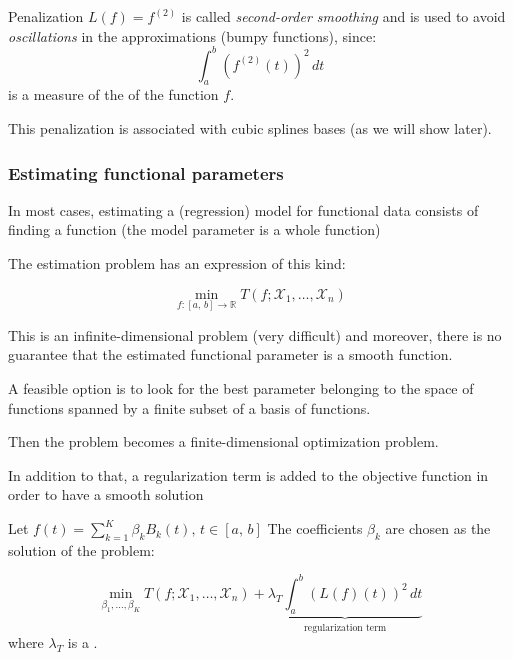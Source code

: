Penalization $L(f) = f^{(2)}$ is called \emph{second-order smoothing} and
is used to avoid \emph{oscillations} in the approximations (bumpy functions),
since:
\begin{equation*}
    \int_{a}^{b} \left(
        f^{(2)}(t)
    \right)^2\, dt
\end{equation*}
is a measure of the  of the function $f$.

\begin{note}
    This penalization is associated with cubic splines bases (as we will show later).
\end{note}

\subsubsection{Estimating functional parameters}

In most cases, estimating a (regression) model for functional data
consists of finding a function (the model parameter is a whole function)

The estimation problem has an expression of this kind:
\begin{problem}{}{}
    \begin{equation*}
        \min_{f:[a,\,b] \to \mathds R} T(f; \mathcal X_1,\ldots,\mathcal X_n)
    \end{equation*}
\end{problem}

This is an infinite-dimensional problem (very difficult) and moreover,
there is no guarantee that the estimated functional parameter is a smooth 
function.

A feasible option is to look for the best parameter belonging to the space of functions spanned by
a finite subset of a basis of functions.

Then the problem becomes a finite-dimensional optimization problem.

In addition to that, a regularization term is added to the objective function
in order to have a smooth solution

Let $f(t) = \sum_{k=1}^K \beta_k B_k(t),\,t\in [a,\,b]$
The coefficients $\beta_k$ are chosen as the solution of the problem:
\begin{problem}{}{}
    \begin{equation*}
        \min_{\beta_1,\ldots,\beta_K} T(f; \mathcal X_1,\ldots,\mathcal X_n)
        + \underbrace{\lambda_T \int_{a}^{b} \left(
            L(f)(t)
    \right)^2\, dt}_{\text{regularization term}}
    \end{equation*}
where $\lambda_T$ is a .
\end{problem}


